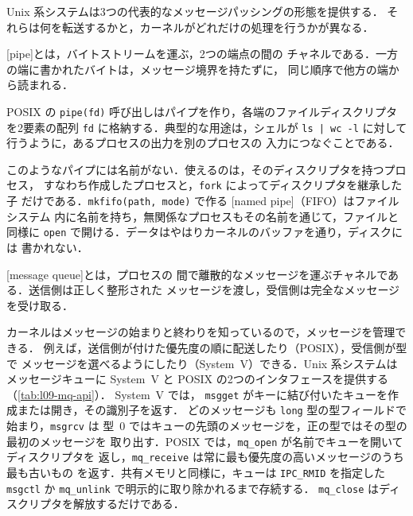 \documentclass[../main.tex]{subfiles}
\begin{document}
Unix 系システムは3つの代表的なメッセージパッシングの形態を提供する．
それらは何を転送するかと，カーネルがどれだけの処理を行うかが異なる．

\begin{definition}[パイプ]
  [pipe]とは，バイトストリームを運ぶ，2つの端点の間の
  チャネルである．一方の端に書かれたバイトは，メッセージ境界を持たずに，
  同じ順序で他方の端から読まれる．
\end{definition}

POSIX の \texttt{pipe(fd)} 呼び出しはパイプを作り，各端のファイルディスクリプタ
を2要素の配列 \texttt{fd} に格納する．典型的な用途は，シェルが
\texttt{ls | wc -l} に対して行うように，あるプロセスの出力を別のプロセスの
入力につなぐことである．

このようなパイプには名前がない．使えるのは，そのディスクリプタを持つプロセス，
すなわち作成したプロセスと，\texttt{fork} によってディスクリプタを継承した子
だけである．\texttt{mkfifo(path, mode)} で作る
[named pipe]（FIFO）はファイルシステム
内に名前を持ち，無関係なプロセスもその名前を通じて，ファイルと同様に
\texttt{open} で開ける．データはやはりカーネルのバッファを通り，ディスクには
書かれない．

\begin{definition}[メッセージキュー]
  [message queue]とは，プロセスの
  間で離散的なメッセージを運ぶチャネルである．送信側は正しく整形された
  メッセージを渡し，受信側は完全なメッセージを受け取る．
\end{definition}

カーネルはメッセージの始まりと終わりを知っているので，メッセージを管理できる．
例えば，送信側が付けた優先度の順に配送したり（POSIX），受信側が型で
メッセージを選べるようにしたり（System~V）できる．Unix 系システムは
メッセージキューに System~V と POSIX の2つのインタフェースを提供する
（\cref{tab:l09-mq-api}）．%
System~V では，
\texttt{msgget} がキーに結び付いたキューを作成または開き，その識別子を返す．
どのメッセージも \texttt{long} 型の型フィールドで始まり，\texttt{msgrcv} は
型~0 ではキューの先頭のメッセージを，正の型ではその型の最初のメッセージを
取り出す．POSIX では，\texttt{mq\_open} が名前でキューを開いてディスクリプタを
返し，\texttt{mq\_receive} は常に最も優先度の高いメッセージのうち最も古いもの
を返す．共有メモリと同様に，キューは \texttt{IPC\_RMID} を指定した
\texttt{msgctl} か \texttt{mq\_unlink} で明示的に取り除かれるまで存続する．
\texttt{mq\_close} はディスクリプタを解放するだけである．
\end{document}
